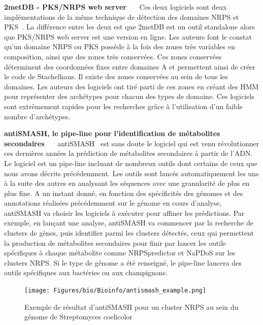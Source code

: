 \textbf{2metDB - PKS/NRPS web server}~~~
Ces deux logiciels sont deux implémentations de la même technique de détection des domaines NRPS et PKS~\cite{bachmann_chapter_2009}.
La différence entre les deux est que 2metDB est un outil standalone alors que PKS/NRPS web server est une version en ligne.
Les auteurs font le constat qu'un domaine NRPS ou PKS possède à la fois des zones très variables en composition, ainsi que des zones très conservées.
Ces zones conservées déterminent des coordonnées fixes entre domaines A et permettent ainsi de créer le code de Stachelhaus.
Il existe des zones conservées au sein de tous les domaines.
Les auteurs des logiciels ont tiré parti de ces zones en créant des HMM pour représenter des archétypes pour chacun des types de domaine.
Ces logiciels sont extrêmement rapides pour les recherches grâce à l'utilisation d'un faible nombre d'archétypes.


\label{antismash}
\textbf{antiSMASH, le pipe-line pour l'identification de métabolites secondaires}~~~
antiSMASH~\cite{weber_antismash_2015,medema_antismash:_2011} est sans doute le logiciel qui est venu révolutionner ces dernières années la prédiction de métabolites secondaires à partir de l'ADN.
Le logiciel est un pipe-line incluant de nombreux outils dont certains de ceux que nous avons décrits précédemment.
Les outils sont lancés automatiquement les uns à la suite des autres en analysant les séquences avec une granularité de plus en plus fine.
A un instant donné, en fonction des spécificités des génomes et des annotations réalisées précédemment sur le génome en cours d'analyse, antiSMASH va choisir les logiciels à exécuter pour affiner les prédictions.
Par exemple, en lançant une analyse, antiSMASH va commencer par la recherche de clusters de gènes, puis identifier parmi les clusters détectés, ceux qui permettent la production de métabolites secondaires pour finir par lancer les outils spécifiques à chaque métabolite comme NRPSpredictor et NaPDoS sur les clusters NRPS.
Si le type de génome a été renseigné, le pipe-line lancera des outils spécifiques aux bactéries ou aux champignons.

\begin{figure}
  \begin{center}
    \texttt{[image: Figures/bio/Bioinfo/antismash\_example.png]}
    \caption{\label{antismash_result}Exemple de résultat d'antiSMASH pour un cluster NRPS au sein du génome de Streptomyces coelicolor}
  \end{center}
\end{figure}

